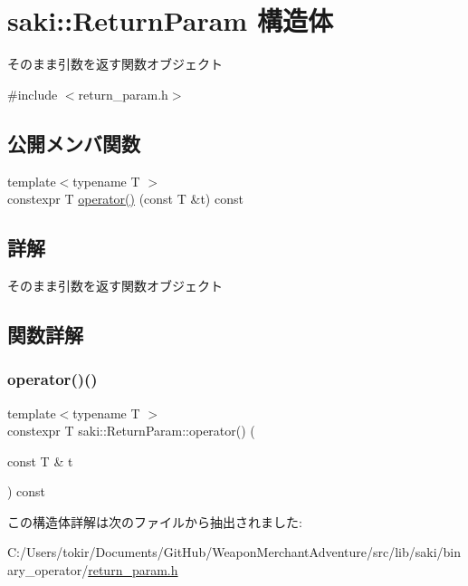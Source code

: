 \hypertarget{structsaki_1_1_return_param}{}\section{saki\+:\+:Return\+Param 構造体}
\label{structsaki_1_1_return_param}


そのまま引数を返す関数オブジェクト  




{\ttfamily \#include $<$return\+\_\+param.\+h$>$}

\subsection*{公開メンバ関数}
\begin{DoxyCompactItemize}
\item 
{\footnotesize template$<$typename T $>$ }\\constexpr T \mbox{\hyperlink{structsaki_1_1_return_param_aac580f81f20f20e1f29cb17992e1520b}{operator()}} (const T \&t) const
\end{DoxyCompactItemize}


\subsection{詳解}
そのまま引数を返す関数オブジェクト 

\subsection{関数詳解}
\mbox{\label{structsaki_1_1_return_param_aac580f81f20f20e1f29cb17992e1520b}} 
\subsubsection{\texorpdfstring{operator()()}{operator()()}}
{\footnotesize\ttfamily template$<$typename T $>$ \\
constexpr T saki\+::\+Return\+Param\+::operator() (\begin{DoxyParamCaption}\item[{const T \&}]{t }\end{DoxyParamCaption}) const\hspace{0.3cm}{\ttfamily [inline]}}



この構造体詳解は次のファイルから抽出されました\+:\begin{DoxyCompactItemize}
\item 
C\+:/\+Users/tokir/\+Documents/\+Git\+Hub/\+Weapon\+Merchant\+Adventure/src/lib/saki/binary\+\_\+operator/\mbox{\hyperlink{return__param_8h}{return\+\_\+param.\+h}}\end{DoxyCompactItemize}
